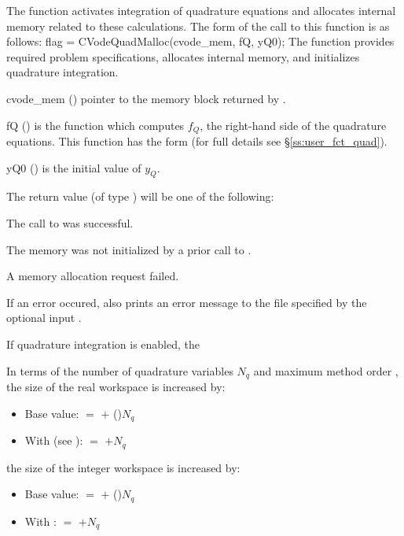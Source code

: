 The function  activates integration of quadrature equations 
and allocates internal memory related to these calculations.
The form of the call to this function is as follows:
{
flag = CVodeQuadMalloc(cvode\_mem, fQ, yQ0);
}
{
  The function  provides required problem specifications,
  allocates internal memory, and initializes quadrature integration.
}
{
  \begin{args}
  \item[cvode\_mem] ()
    pointer to the {\cvodes} memory block returned by .
  \item[fQ] ()
    is the {\C} function which computes $f_Q$, the right-hand side of the quadrature
    equations. This function has the form 
     (for full details see \S\ref{ss:user_fct_quad}).
  \item[yQ0] ()
    is the initial value of $y_Q$.
  \end{args}
}
{
  The return value  (of type ) will be one of the following:
  \begin{args}
  \item[\Id{CV\_SUCCESS}]
    The call to  was successful.
  \item[\Id{CV\_MEM\_NULL}] 
    The {\cvodes} memory was not initialized by a prior call to .
  \item[\Id{CV\_MEM\_FAIL}] 
    A memory allocation request failed.
  \end{args}
}
{
  If an error occured,  also prints an error message to the
  file specified by the optional input .

  If quadrature integration is enabled, the 
}
In terms of the number of quadrature variables $N_q$ and maximum method order ,
the size of the real workspace is increased by:
\begin{itemize}
\item Base value:  $=$  $+$ ()$N_q$
\item With  (see ):  $=$  $+ N_q$ 
\end{itemize}
the size of the integer workspace is increased by:
\begin{itemize}
\item Base value:  $=$  $+$ ()$N_q$
\item With :  $=$  $+ N_q$ 
\end{itemize}


